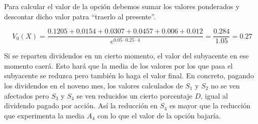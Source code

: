 \begin{problem}[1]
Para calcular el valor de la opción debemos sumar los valores ponderados y descontar dicho valor patra ``traerlo al presente''.

\[V_0(X) = \frac{0.1205 +0.0154 + 0.0307 + 0.0457 + 0.006 + 0.012}{e^{0.05\cdot 0.25\cdot 4}}=\frac{0.284}{1.05}=0.27\]

\spart

Si se reparten dividendos en un cierto momento, el valor del subyacente en ese momento caerá. Esto hará que la media de los valores por los que pasa el subyacente se reduzca pero también lo haga el valor final. En concreto, pagando los dividendos en el noveno mes, los valores calculados de $S_1$ y $S_2$ no se ven afectados pero $S_3$ y $S_4$ se ven reducidos un cierto porcentaje $D$, igual al dividendo pagado por acción. Así la reducción en $S_4$ es mayor que la reducción que experimenta la media $A_4$ con lo que el valor de la opción bajaría.
\end{problem}

